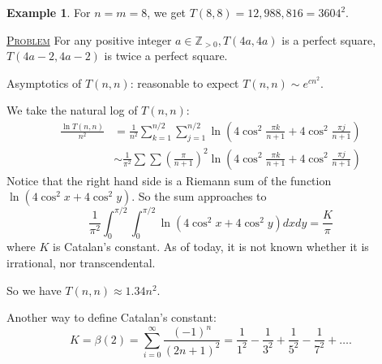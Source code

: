 \documentclass{report}
\newcommand{\Z}{\mathbb{Z}}
\newcommand{\fancyem}[1]{\underline{\textsc{#1}}}
\theoremstyle{definition}
\newtheorem{example}{Example}[section]
\theoremstyle{remark}
\numberwithin{equation}{section}
\begin{document}
\begin{example}
For $n = m = 8$, we get $T(8, 8) = 12,988,816 = 3604^2.$
\end{example}

\fancyem{Problem} For any positive integer $a \in \Z_{>0}, T(4a, 4a)$ is a perfect square, $T(4a - 2, 4a - 2)$ is twice a perfect square.

Asymptotics of $T(n, n)$: reasonable to expect $T(n, n) \sim e^{cn^2}$.

We take the natural log of $T(n, n)$:
\begin{align*}
\frac{\ln T(n, n)}{n^2} & = \frac{1}{n^2}\sum_{k=1}^{n/2}\sum_{j=1}^{n/2} \ln\left(4\cos^2\frac{\pi k}{n+1} + 4\cos^2\frac{\pi j}{n+1}\right) \\
& \sim \frac{1}{\pi^2}\sum\sum \left(\frac{\pi}{n+1}\right)^2 \ln\left(4\cos^2\frac{\pi k}{n+1} + 4\cos^2\frac{\pi j}{n+1}\right)
\end{align*}
Notice that the right hand side is a Riemann sum of the function $\ln(4\cos^2x+4\cos^2y)$. So the sum approaches to 
\[
\frac{1}{\pi^2} \int_0^{\pi/2}\int_0^{\pi/2} \ln(4\cos^2x+4\cos^2y)dxdy = \frac{K}{\pi}
\]
where $K$ is Catalan's constant. As of today, it is not known whether it is irrational, nor transcendental.

So we have $T(n, n) \approx 1.34n^2.$

Another way to define Catalan's constant:
\[
K = \beta(2) = \sum_{i=0}^\infty \frac{(-1)^n}{(2n+1)^2} = \frac{1}{1^2} - \frac{1}{3^2} + \frac{1}{5^2} - \frac{1}{7^2} + \ldots.
\]
\end{document}
